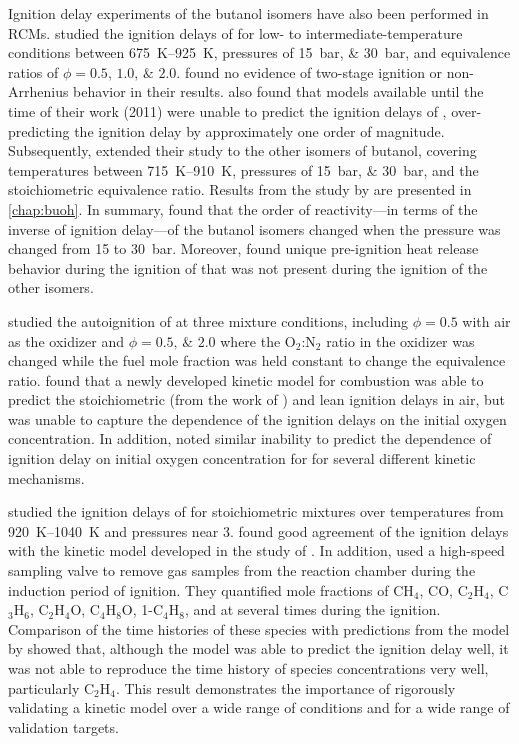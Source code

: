 \documentclass[../main.tex]{subfiles}
\begin{document}
Ignition delay experiments of the butanol isomers have also been
performed in RCMs. \textcite{Weber2011} studied the ignition delays of
\nBuOH{} for low- to intermediate-temperature conditions between
\SIrange{675}{925}{\kelvin}, pressures of
\SIlist{15;30}{\bar}, and equivalence ratios of $\phi = \numlist{0.5;1.0;2.0}$.
\textcite{Weber2011} found no evidence of two-stage ignition or
non-Arrhenius behavior in their results. \textcite{Weber2011} also found
that models available until the time of their work (2011) were unable
to predict the ignition delays of \nBuOH{}, over-predicting
the ignition delay by approximately one order of magnitude. Subsequently,
\textcite{Weber2013} extended their study to the other isomers of
butanol, covering temperatures between \SIrange{715}{910}{\kelvin},
pressures of \SIlist{15;30}{\bar}, and the stoichiometric equivalence
ratio. Results from the study by \textcite{Weber2013} are presented in
\cref{chap:buoh}. In summary, \textcite{Weber2013} found that the order of
reactivity---in terms of the inverse of ignition delay---of the butanol
isomers changed when the pressure was changed from \num{15} to \SI{30}{\bar}.
Moreover, \textcite{Weber2013} found unique pre-ignition heat release
behavior during the ignition of \tBuOH{} that was not present
during the ignition of the other isomers.

\textcite{Weber2013a} studied the autoignition of \iBuOH{}
at three mixture conditions, including $\phi = 0.5$ with air as the
oxidizer and $\phi = \numlist{0.5;2.0}$ where the O$_2$:N$_2$
ratio in the oxidizer was changed while the fuel mole fraction was held constant
to change the equivalence ratio. \textcite{Weber2013a} found that
a newly developed kinetic model for \iBuOH{} combustion
was able to predict the stoichiometric (from the work of \textcite{Weber2013})
and lean ignition delays in air, but was unable to capture the
dependence of the ignition delays on the initial oxygen concentration.
In addition, \textcite{Weber2011, Zhu2014} noted similar inability to predict
the dependence of ignition delay on initial oxygen concentration for
\nBuOH{} for several different kinetic mechanisms.

\textcite{Karwat2011a} studied the ignition delays of \nBuOH{}
for stoichiometric mixtures over temperatures from \SIrange{920}{1040}{\kelvin}
and pressures near \SI{3}{\atmosphere}. \textcite{Karwat2011a} found good
agreement of the ignition delays with the kinetic model developed in the
study of \textcite{Black2010}. In addition, \textcite{Karwat2011a} used
a high-speed sampling valve to remove gas samples from the reaction chamber
during the induction period of \nBuOH{} ignition. They quantified
mole fractions of CH$_4$, CO, C$_2$H$_4$, C$_3$H$_6$, C$_2$H$_4$O, C$_4$H$_8$O,
1-C$_4$H$_8$, and \nBuOH{} at several times during the ignition.
Comparison of the time histories of these species with predictions from
the model by \textcite{Black2010} showed that, although the model was able
to predict the ignition delay well, it was not able to reproduce the time history
of species concentrations very well, particularly C$_2$H$_4$. This result
demonstrates the importance of rigorously validating a kinetic model over
a wide range of conditions and for a wide range of validation targets.
\end{document}
